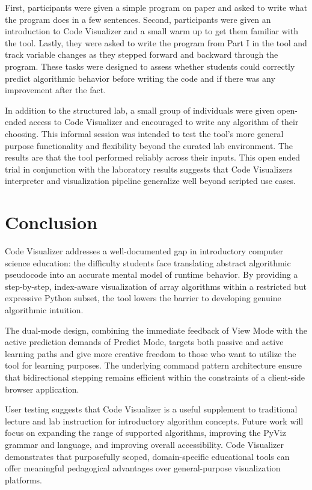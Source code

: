 \documentclass{IEEEtran}
\begin{document}
First, participants were given a simple program on paper and asked to write what the program does in a few sentences. Second, participants were given an introduction to Code Visualizer and a small warm up to get them familiar with the tool. Lastly, they were asked to write the program from Part I in the tool and track variable changes as they stepped forward and backward through the program. These tasks were designed to assess whether students could correctly predict algorithmic behavior before writing the code and if there was any improvement after the fact.

In addition to the structured lab, a small group of individuals were given open-ended access to Code Visualizer and encouraged to write any algorithm of their choosing. This informal session was intended to test the tool's more general purpose functionality and flexibility beyond the curated lab environment. The results are that the tool performed reliably across their inputs. This open ended trial in conjunction with the laboratory results suggests that Code Visualizers interpreter and visualization pipeline generalize well beyond scripted use cases.

\section{Conclusion}

Code Visualizer addresses a well-documented gap in introductory computer science education: the difficulty students face translating abstract algorithmic pseudocode into an accurate mental model of runtime behavior. By providing a step-by-step, index-aware visualization of array algorithms within a restricted but expressive Python subset, the tool lowers the barrier to developing genuine algorithmic intuition.

The dual-mode design, combining the immediate feedback of View Mode with the active prediction demands of Predict Mode, targets both passive and active learning paths and give more creative freedom to those who want to utilize the tool for learning purposes. The underlying command pattern architecture ensure that bidirectional stepping remains efficient within the constraints of a client-side browser application.

User testing suggests that Code Visualizer is a useful supplement to traditional lecture and lab instruction for introductory algorithm concepts. Future work will focus on expanding the range of supported algorithms, improving the PyViz grammar and language, and improving overall accessibility. Code Visualizer demonstrates that purposefully scoped, domain-specific educational tools can offer meaningful pedagogical advantages over general-purpose visualization platforms.
\end{document}
